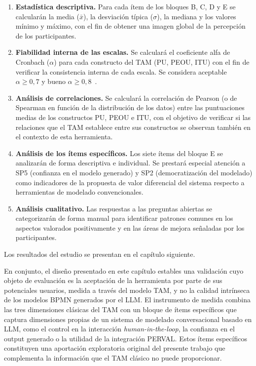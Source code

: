 \begin{enumerate}
  \item \textbf{Estadística descriptiva.} Para cada ítem de los bloques B, C, D y E se calcularán la media ($\bar{x}$), la desviación típica ($\sigma$), la mediana y los valores mínimo y máximo, con el fin de obtener una imagen global de la percepción de los participantes.

  \item \textbf{Fiabilidad interna de las escalas.} Se calculará el coeficiente alfa de Cronbach ($\alpha$) para cada constructo del TAM (PU, PEOU, ITU) con el fin de verificar la consistencia interna de cada escala. Se considera aceptable $\alpha \geq 0{,}7$ y bueno $\alpha \geq 0{,}8$~\cite{davis1989tam}.

  \item \textbf{Análisis de correlaciones.} Se calculará la correlación de Pearson (o de Spearman en función de la distribución de los datos) entre las puntuaciones medias de los constructos PU, PEOU e ITU, con el objetivo de verificar si las relaciones que el TAM establece entre sus constructos se observan también en el contexto de esta herramienta.

  \item \textbf{Análisis de los ítems específicos.} Los siete ítems del bloque E se analizarán de forma descriptiva e individual. Se prestará especial atención a SP5 (confianza en el modelo generado) y SP2 (democratización del modelado) como indicadores de la propuesta de valor diferencial del sistema respecto a herramientas de modelado convencionales.

  \item \textbf{Análisis cualitativo.} Las respuestas a las preguntas abiertas se categorizarán de forma manual para identificar patrones comunes en los aspectos valorados positivamente y en las áreas de mejora señaladas por los participantes.
\end{enumerate}

Los resultados del estudio se presentan en el capítulo siguiente.

En conjunto, el diseño presentado en este capítulo estables una validación cuyo objeto de evaluación es la aceptación de la herramienta por parte de sus potenciales usuarios, medida a través del modelo TAM, y no la calidad intrínseca de los modelos BPMN generados por el LLM. El instrumento de medida combina las tres dimensiones clásicas del TAM con un bloque de ítems específicos que captura dimensiones propias de un sistema de modelado conversacional basado en LLM, como el control en la interacción \textit{human-in-the-loop}, la confianza en el output generado o la utilidad de la integración PERVAL. Estos ítems específicos constituyen una aportación exploratoria original del presente trabajo que complementa la información que el TAM clásico no puede proporcionar. 

